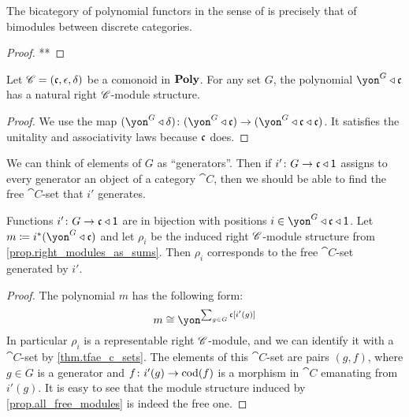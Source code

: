 \documentclass[DynamicalBook]{subfiles}
\begin{document}
\begin{proposition}
The bicategory of polynomial functors in the sense of \cite{GK} is precisely that of bimodules between discrete categories.
\end{proposition}
\begin{proof}
**
\end{proof}


\begin{proposition}\label{prop.all_free_modules}
Let $\mathscr{C}=(\mathfrak{c},\epsilon,\delta)$ be a comonoid in $\textbf{Poly}$. For any set $G$, the polynomial $\yon^G\tri\ema{c}$ has a natural right $\mathscr{C}$-module structure.
\end{proposition}
\begin{proof}
We use the map $(\yon^G\tri\delta)\colon(\yon^G\tri\ema{c})\to(\yon^G\tri\ema{c}\tri\ema{c})$. It satisfies the unitality and associativity laws because $\mathfrak{c}$ does.
\end{proof}

We can think of elements of $G$ as ``generators''. Then if $i'\colon G\to\mathfrak{c}\mathbin{\triangleleft}\textsf{1}$ assigns to every generator an object of a category $\cat{C}$, then we should be able to find the free $\cat{C}$-set that $i'$ generates.

\begin{proposition}
Functions $i'\colon G\to\mathfrak{c}\mathbin{\triangleleft}\textsf{1}$ are in bijection with positions $i\in\yon^G\tri\ema{c}\tri\1$. Let $m\coloneqq i^*(\yon^G\tri\ema{c})$ and let $\rho_i$ be the induced right $\mathscr{C}$-module structure from \cref{prop.right_modules_as_sums}. Then $\rho_i$ corresponds to the free $\cat{C}$-set generated by $i'$. 
\end{proposition}
\begin{proof}
The polynomial $m$ has the following form:
\[
m\cong\yon^{\sum_{g\in G}\ema{c}[i'(g)]}
\]
In particular $\rho_i$ is a representable right $\mathscr{C}$-module, and we can identify it with a $\cat{C}$-set by \cref{thm.tfae_c_sets}. The elements of this $\cat{C}$-set are pairs $(g, f)$, where $g\in G$ is a generator and $f\colon i'(g)\to\operatorname{cod}(f)$ is a morphism in $\cat{C}$ emanating from $i'(g)$. It is easy to see that the module structure induced by \cref{prop.all_free_modules} is indeed the free one.
\end{proof}
\end{document}
